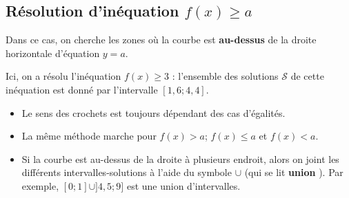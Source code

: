 \documentclass{article}
\begin{document}
\subsection{Résolution d'inéquation $f(x) \geq a$}
Dans ce cas, on cherche les zones où la courbe est \textbf{au-dessus} de la droite horizontale d'équation $y = a$.
\begin{example}
\hfill
\begin{center}
\end{center}
Ici, on a résolu l'inéquation $f(x) \geq 3$ : l'ensemble des solutions $\mathcal{S}$ de cette inéquation est donné par l'intervalle $[1,6;4,4]$.
\end{example}
\begin{tcolorbox}
\begin{remark}
\hfill
\begin{itemize}
\item Le sens des crochets est toujours dépendant des cas d'égalités.
\item La même méthode marche pour $f(x) > a$; $f(x) \leq a$ et $f(x) < a$.
\item Si la courbe est au-dessus de la droite à plusieurs endroit, alors on \og joint \fg les différents intervalles-solutions à l'aide du symbole $\cup$ (qui se lit \textbf{\og union \fg}). Par exemple, $[0;1] \cup ]4,5;9]$ est une union d'intervalles.
\end{itemize}
\end{remark}
\end{tcolorbox}
\end{document}
